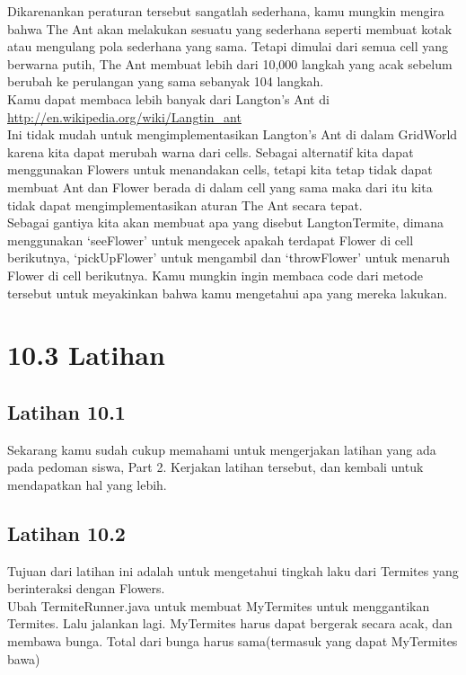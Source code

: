 \documentclass{article}
\begin{document}
	Dikarenankan peraturan tersebut sangatlah sederhana, kamu mungkin mengira bahwa The Ant akan melakukan sesuatu yang sederhana seperti membuat kotak atau mengulang pola sederhana yang sama. Tetapi dimulai dari semua cell yang berwarna putih, The Ant membuat lebih dari 10,000 langkah yang acak sebelum berubah ke perulangan yang sama sebanyak 104 langkah.
	\\
	
	Kamu dapat membaca lebih banyak dari Langton’s Ant di \\
	\url{http://en.wikipedia.org/wiki/Langtin_ant}
	\\
	
	Ini tidak mudah untuk mengimplementasikan Langton’s Ant di dalam GridWorld karena kita dapat merubah warna dari cells. Sebagai alternatif kita dapat menggunakan Flowers untuk menandakan cells, tetapi kita tetap tidak dapat membuat Ant dan Flower berada di dalam cell yang sama maka dari itu kita tidak dapat mengimplementasikan aturan The Ant secara tepat.
	\\
	
	Sebagai gantiya kita akan membuat apa yang disebut LangtonTermite, dimana menggunakan ‘seeFlower’ untuk mengecek apakah terdapat Flower di cell berikutnya, ‘pickUpFlower’ untuk mengambil dan ‘throwFlower’ untuk menaruh Flower di cell berikutnya. Kamu mungkin ingin membaca code dari metode tersebut untuk meyakinkan bahwa kamu mengetahui apa yang mereka lakukan.
	\\
	
	\section*{10.3 Latihan}
	\subsection*{Latihan 10.1}
	Sekarang kamu sudah cukup memahami untuk mengerjakan latihan yang ada pada pedoman siswa, Part 2. Kerjakan latihan tersebut, dan kembali untuk mendapatkan hal yang lebih.
	\\
		
	\subsection*{Latihan 10.2}
	Tujuan dari latihan ini adalah untuk mengetahui tingkah laku dari Termites yang berinteraksi dengan Flowers.
	\\
	
	Ubah TermiteRunner.java untuk membuat MyTermites untuk menggantikan Termites. Lalu jalankan lagi. MyTermites harus dapat bergerak secara acak, dan membawa bunga. Total dari bunga harus sama(termasuk yang dapat MyTermites bawa)
	\newpage
	
\end{document}
